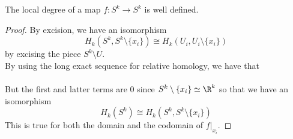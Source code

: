 \documentclass[a4paper]{article}
\begin{document}
\begin{lmm}{}{} The local degree of a map $f:S^k\to S^k$ is well defined. 
\begin{proof}
By excision, we have an isomorphism $$H_k(S^k,S^k\setminus\{x_i\})\cong H_k(U_i,U_i\setminus\{x_i\})$$ by excising the piece $S^k\setminus U$. \\

By using the long exact sequence for relative homology, we have that \\
\\
But the first and latter terms are $0$ since $S^k\setminus\{x_i\}\simeq\R^k$ so that we have an isomorphism $$H_k(S^k)\cong H_k(S^k,S^k\setminus\{x_i\})$$ This is true for both the domain and the codomain of $f|_{x_i}$. 
\end{proof}
\end{lmm}
\end{document}
